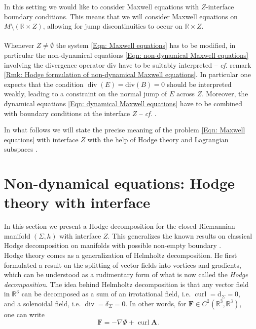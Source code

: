 In this setting we would like to consider Maxwell equations with $Z$-interface boundary conditions. This means that we will consider Maxwell equations on $M\setminus(\mathbb{R}\times Z)$, allowing for jump discontinuities to occur on $\mathbb{R}\times Z$.
\\\\


Whenever $Z\neq\emptyset$ the system \eqref{Eqn: Maxwell equations} has to be modified, in particular the non-dynamical equations \eqref{Eqn: non-dynamical Maxwell equations} involving the divergence operator $\mathrm{div}$ have to be suitably interpreted -- \textit{cf.} remark \ref{Rmk: Hodge formulation of non-dynamical Maxwell equations}.
In particular one expects that the condition $\operatorname{div}(E)=\mathrm{div}(B)=0$ should be interpreted weakly, leading to a constraint on the normal jump of $E$ across $Z$.
Moreover, the dynamical equations \eqref{Eqn: dynamical Maxwell equations} have to be combined with boundary conditions at the interface $Z$ -- \textit{cf.} \cite[Sec. I.5]{Jackson-99}.

In what follows we will state the precise meaning of the problem \eqref{Eqn: Maxwell equations} with interface $Z$ with the help of Hodge theory and Lagrangian subspaces \cite{Everitt-Markus-99,Everitt-Markus-03,Everitt-Markus-05}.


\section{Non-dynamical equations: Hodge theory with interface}\label{Sec: Non-dynamical equations: Hodge theory with interface}
In this section we present a Hodge decomposition for the closed Riemannian manifold $(\Sigma,h)$ with interface $Z$.
This generalizes the known results on classical Hodge decomposition on manifolds with possible non-empty boundary \cite{Amar-17,Axelsson-McIntosh-04,Gaffney-55,Gromov-91,Kodaira-49,Li-09,Schwarz-95,Scott-95,Zulfikar-Stroock-00}.\\



Hodge theory comes as a generalization of Helmholtz decomposition. He first formulated a result on the splitting of vector fields into vortices and gradients, which can be understood as a rudimentary form of what is now called the \emph{Hodge decomposition}. The idea behind Helmholtz decomposition is that any vector field in $\mathbb{R}^3$ can be decomposed as a sum of an irrotational field, i.e. $\operatorname{curl}=\mathrm{d}_\Sigma=0$, and a solenoidal field, i.e. $\operatorname{div}=\delta_\Sigma=0$. In other words, for $\mathbf{F}\in C^2(\mathbb{R}^3,\mathbb{R}^3)$, one can write
\begin{equation}
\mathbf{F}=-\nabla\Phi+\operatorname{curl}\mathbf{A}.
\end{equation}


